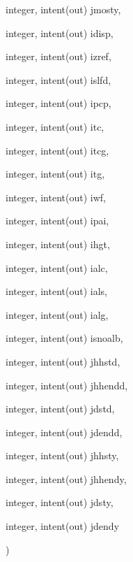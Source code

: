 {\begin{DoxyParamCaption}
\item[{integer, intent(out)}]{jmosty, }
\item[{integer, intent(out)}]{idisp, }
\item[{integer, intent(out)}]{izref, }
\item[{integer, intent(out)}]{islfd, }
\item[{integer, intent(out)}]{ipcp, }
\item[{integer, intent(out)}]{itc, }
\item[{integer, intent(out)}]{itcg, }
\item[{integer, intent(out)}]{itg, }
\item[{integer, intent(out)}]{iwf, }
\item[{integer, intent(out)}]{ipai, }
\item[{integer, intent(out)}]{ihgt, }
\item[{integer, intent(out)}]{ialc, }
\item[{integer, intent(out)}]{ials, }
\item[{integer, intent(out)}]{ialg, }
\item[{integer, intent(out)}]{isnoalb, }
\item[{integer, intent(out)}]{jhhstd, }
\item[{integer, intent(out)}]{jhhendd, }
\item[{integer, intent(out)}]{jdstd, }
\item[{integer, intent(out)}]{jdendd, }
\item[{integer, intent(out)}]{jhhsty, }
\item[{integer, intent(out)}]{jhhendy, }
\item[{integer, intent(out)}]{jdsty, }
\item[{integer, intent(out)}]{jdendy}
\end{DoxyParamCaption}
)}\label{read__from__job__options_8f90_a20cec43eab235567e47a309edb57d040}

